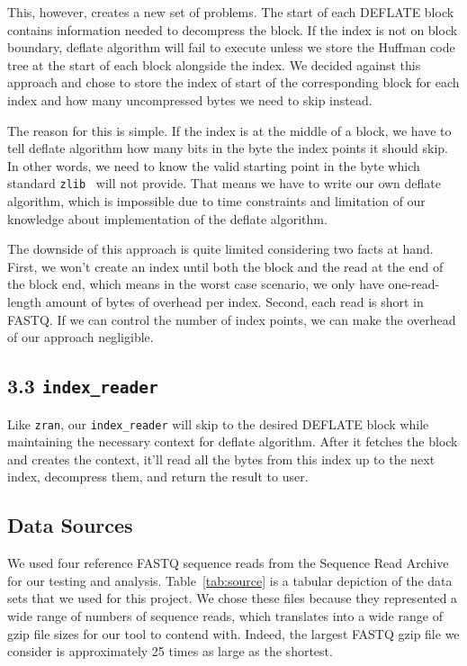 \documentclass[unnumsec,webpdf,contemporary,large]{oup-authoring-template}
\newcommand{\zlib}{\texttt{zlib}\xspace}
\newcommand{\zran}{\texttt{zran}\xspace}
\newcommand{\ireader}{\texttt{index\_reader}\xspace}
\newcommand{\gzip}{gzip\xspace}
\begin{document}
This, however, creates a new set of problems. The start of each DEFLATE block contains information needed to decompress the block. If the index is not on block boundary, deflate algorithm will fail to execute unless we store the Huffman code tree at the start of each block alongside the index. We decided against this approach and chose to store the index of start of the corresponding block for each index and how many uncompressed bytes we need to skip instead. 

The reason for this is simple. If the index is at the middle of a block, we have to tell deflate algorithm how many bits in the byte the index points it should skip. In other words, we need to know the valid starting point in the byte which standard \zlib~\cite{zlib} will not provide. That means we have to write our own deflate algorithm, which is impossible due to time constraints and limitation of our knowledge about implementation of the deflate algorithm. 

The downside of this approach is quite limited considering two facts at hand. First, we won't create an index until both the block and the read at the end of the block end, which means in the worst case scenario, we only have one-read-length amount of bytes of overhead per index. Second, each read is short in FASTQ. If we can control the number of index points, we can make the overhead of our approach negligible.  
\label{sec:ibuilder}

\subsection{3.3 \ireader}
Like \zran, our \ireader will skip to the desired DEFLATE block while maintaining the necessary context for deflate algorithm. After it fetches the block and creates the context, it'll read all the bytes from this index up to the next index, decompress them, and return the result to user.
\label{sec:ireader}

\subsection{Data Sources}

We used four reference FASTQ sequence reads from the Sequence Read
Archive~\cite{SRA} for our testing and analysis. Table~\ref{tab:source} is a
tabular depiction of the data sets that we used for this project. We chose these
files because they represented a wide range of numbers of sequence reads, which
translates into a wide range of \gzip file sizes for our tool to contend with.
Indeed, the largest FASTQ \gzip file we consider is approximately 25 times as
large as the shortest.
\end{document}
